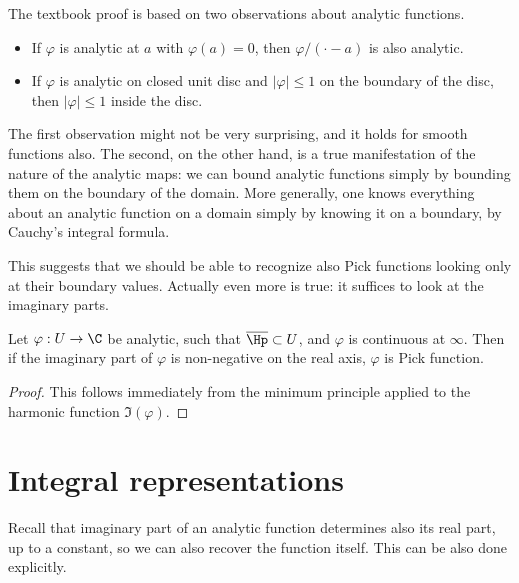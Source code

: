 The textbook proof is based on two observations about analytic functions.
\begin{itemize}
	\item If $\varphi$ is analytic at $a$ with $\varphi(a) = 0$, then $\varphi/(\cdot - a)$ is also analytic.
	\item If $\varphi$ is analytic on closed unit disc and $|\varphi| \leq 1$ on the boundary of the disc, then $|\varphi| \leq 1$ inside the disc.
\end{itemize}

The first observation might not be very surprising, and it holds for smooth functions also. The second, on the other hand, is a true manifestation of the nature of the analytic maps: we can bound analytic functions simply by bounding them on the boundary of the domain. More generally, one knows everything about an analytic function on a domain simply by knowing it on a boundary, by Cauchy's integral formula.

This suggests that we should be able to recognize also Pick functions looking only at their boundary values. Actually even more is true: it suffices to look at the imaginary parts.

\begin{prop}
	Let $\varphi : U \to \C$ be analytic, such that $\overline{\Hp} \subset U$, and $\varphi$ is continuous at $\infty$. Then if the imaginary part of $\varphi$ is non-negative on the real axis, $\varphi$ is Pick function.
\end{prop}
\begin{proof}
	This follows immediately from the minimum principle applied to the harmonic function $\Im(\varphi)$.
\end{proof}

\section{Integral representations}

Recall that imaginary part of an analytic function determines also its real part, up to a constant, so we can also recover the function itself. This can be also done explicitly.

